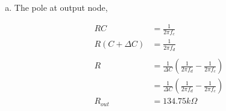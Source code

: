 \documentclass{article}
\begin{document}
\begin{enumerate}[(a)]
\item The pole at output node,

\begin{equation*}
\begin{aligned}
RC &= \frac{1}{2\pi{}f_{c}} \\
R(C + \Delta{}C) &= \frac{1}{2\pi{}f_{d}} \\
\\
R &= \frac{1}{\Delta{}C}(\frac{1}{2\pi{}f_{d}} - \frac{1}{2\pi{}f_{c}}) \\
&= \frac{1}{\Delta{}C}(\frac{1}{2\pi{}f_{d}} - \frac{1}{2\pi{}f_{c}}) \\
R_{out} &= 134.75 k\Omega \\
\end{aligned}
\end{equation*}
\end{enumerate}
\end{document}
